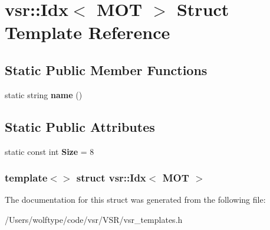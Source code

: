\hypertarget{structvsr_1_1_idx_3_01_m_o_t_01_4}{\section{vsr\-:\-:Idx$<$ M\-O\-T $>$ Struct Template Reference}
\label{structvsr_1_1_idx_3_01_m_o_t_01_4}
}
\subsection*{Static Public Member Functions}
\begin{DoxyCompactItemize}
\item 
\hypertarget{structvsr_1_1_idx_3_01_m_o_t_01_4_a4db5bd6dfcbad6c97a1724585a39d165}{static string {\bfseries name} ()}\label{structvsr_1_1_idx_3_01_m_o_t_01_4_a4db5bd6dfcbad6c97a1724585a39d165}

\end{DoxyCompactItemize}
\subsection*{Static Public Attributes}
\begin{DoxyCompactItemize}
\item 
\hypertarget{structvsr_1_1_idx_3_01_m_o_t_01_4_a913a5b3008f42fc795464073b280e38f}{static const int {\bfseries Size} = 8}\label{structvsr_1_1_idx_3_01_m_o_t_01_4_a913a5b3008f42fc795464073b280e38f}

\end{DoxyCompactItemize}
\subsubsection*{template$<$$>$ struct vsr\-::\-Idx$<$ M\-O\-T $>$}



The documentation for this struct was generated from the following file\-:\begin{DoxyCompactItemize}
\item 
/\-Users/wolftype/code/vsr/\-V\-S\-R/vsr\-\_\-templates.\-h\end{DoxyCompactItemize}
